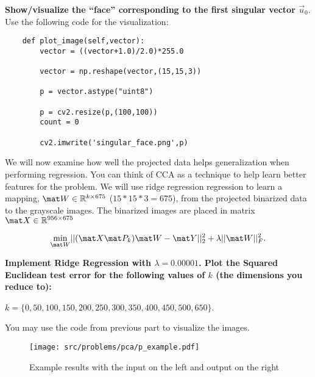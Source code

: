 \documentclass[preview]{standalone}
\begin{document}
\begin{Parts}
{\bf Show/visualize the ``face'' corresponding to the first singular vector $\vec u_0$}. Use the following code for the visualization:

\begin{lstlisting}
	def plot_image(self,vector):
		vector = ((vector+1.0)/2.0)*255.0

		vector = np.reshape(vector,(15,15,3))

		p = vector.astype("uint8")

		p = cv2.resize(p,(100,100))
		count = 0

		cv2.imwrite('singular_face.png',p)
\end{lstlisting}





\Part We will now examine how well the projected data helps
generalization when performing regression. You can think of CCA as a
technique to help learn better features for the problem. We will use
ridge regression regression to learn a mapping, 
$\mat W \in \mathbb{R}^{k\times 675}$ ($15*15*3=675$), from the projected
binarized data to the grayscale images. The binarized images are placed
in matrix $\mat X \in \mathbb{R}^{956 \times 675}$

\begin{align*}
	\underset{\mat W}{\mbox{min}} ||(\mat X\mat P_k) \mat W - \mat Y||^2_2 + \lambda||\mat W||^2_{F}.
\end{align*}

{\bf Implement Ridge Regression with $\lambda = 0.00001$. Plot the
  Squared Euclidean test error for the following values of $k$ (the
  dimensions you reduce to):

$k = \lbrace 0,50,100,150,200,250,300,350,400,450,500,650 \rbrace$.}



  You may use the code from previous part to visualize the images.



\begin{figure}[h!]
    \begin{center}
    \texttt{[image: src/problems/pca/p\_example.pdf]}
    \caption{Example results with the input on the left and output on the right} \label{fig:robot}
    \end{center}
\end{figure}












\end{Parts}
\end{document}
